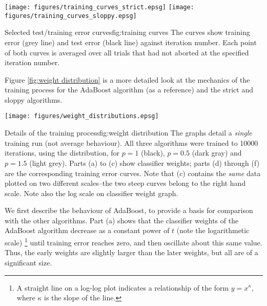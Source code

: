 \begin{linefigure}
\begin{center}
\texttt{[image: figures/training\_curves\_strict.epsg]}
\texttt{[image: figures/training\_curves\_sloppy.epsg]}
\end{center}
\begin{capt}{Selected test/training error curves}{fig:training curves}
The curves show training error (grey line) and test error (black
line) against iteration number.  Each point of both curves is
averaged over all trials that had not aborted at the specified
iteration number.
\end{capt}
\end{linefigure}

Figure \ref{fig:weight distribution} is a more detailed look at the
mechanics of the training process for the AdaBoost algorithm (as a
reference) and the strict and sloppy algorithms.

\begin{linefigure}
\begin{center}
\hspace*{-1cm}\texttt{[image: figures/weight\_distributions.epsg]}
\end{center}
\begin{capt}{Details of the training process}{fig:weight distribution}
The graphs detail a \emph{single} training run (not average
behaviour).  All three algorithms were trained to 10000 iterations,
using the  distribution, for $p=1$ (black), $p=0.5$
(dark gray) and $p=1.5$ (light grey).  Parts (a) to (c) show
classifier weights; parts (d) through (f) are the corresponding
training error curves.  Note that (c) contains the \emph{same} data
plotted on two different scales--the two steep curves belong to the
right hand scale.  Note also the log scale on classifier weight graph.
\end{capt}
\end{linefigure}

We first describe the behaviour of AdaBoost, to provide a basis for
comparison with the other algorithms.  Part (a) shows that the
classifier weights of the AdaBoost algorithm decrease as a constant
power of $t$ (note the logarithmetic scale)%
\footnote{A straight line on a log-log plot indicates a relationship
of the form $y = x^{\kappa}$, where $\kappa$ is the slope of the line.}
until training error reaches zero, and then oscillate about this same
value.  Thus, the early weights are slightly larger than the later
weights, but all are of a significant size.

